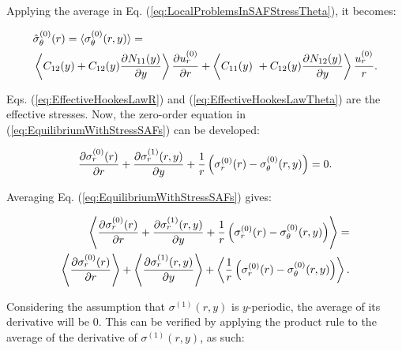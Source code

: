 Applying the average in Eq. (\ref{eq:LocalProblemsInSAFStressTheta}), it becomes:

\begin{equation}
    \begin{aligned}\label{eq:EffectiveHookesLawTheta}
        &\hat{\sigma}^{(0)}_\theta(r) = \langle \sigma^{(0)}_\theta(r,y)\rangle = \\
        &\left \langle C_{12}(y) + C_{12}(y) \frac{\partial N_{11}(y)}{\partial y}\right\rangle \frac{\partial u_r^{(0)}}{\partial r} + \left \langle C_{11}(y)\ + C_{12}(y)\frac{\partial N_{12}(y)}{\partial y}\right \rangle\frac{u_r^{(0)}}{r}. \\
    \end{aligned}
\end{equation}

Eqs. (\ref{eq:EffectiveHookesLawR}) and (\ref{eq:EffectiveHookesLawTheta}) are the effective stresses. Now, the zero-order equation in (\ref{eq:EquilibriumWithStressSAFs}) can be developed:

\begin{equation}
    \begin{aligned} \label{eq:EquilibriumWithStressSAFs}
            \frac{\partial \sigma_r^{(0)}(r)}{\partial r} + \frac{\partial \sigma_r^{(1)}(r,y)}{\partial y} + \frac{1}{r} \left(  \sigma_r^{(0)}(r) - \sigma_{\theta}^{(0)}(r,y) \right) = 0.
        \end{aligned}
\end{equation}

Averaging Eq. (\ref{eq:EquilibriumWithStressSAFs}) gives:

\begin{equation}
    \begin{aligned} \label{eq:EquilibriumWithStressSAFsAveraged}
            \left\langle \frac{\partial \sigma_r^{(0)}(r)}{\partial r} + \frac{\partial \sigma_r^{(1)}(r,y)}{\partial y} + \frac{1}{r} \left(  \sigma_r^{(0)}(r) - \sigma_{\theta}^{(0)}(r,y) \right) \right\rangle = \\
            \left\langle \frac{\partial \sigma_r^{(0)}(r)}{\partial r}\right\rangle + \left\langle\frac{\partial \sigma_r^{(1)}(r,y)}{\partial y}\right\rangle + \left\langle\frac{1}{r} \left( \sigma_r^{(0)}(r) - \sigma_{\theta}^{(0)}(r,y) \right) \right\rangle.
        \end{aligned}
\end{equation}

Considering the assumption that $\sigma^{(1)}(r,y)$ is $y$-periodic, the average of its derivative will be 0. This can be verified by applying the product rule to the average of the derivative of $\sigma^{(1)}(r,y)$, as such:

